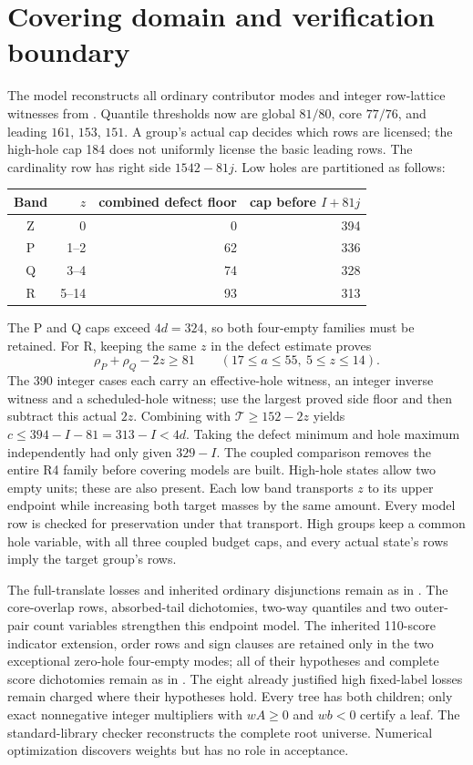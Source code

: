 \documentclass[11pt,a4paper]{article}
\newcommand{\T}{\mathcal T}
\begin{document}
\section{Covering domain and verification boundary}
The model reconstructs all ordinary contributor modes and integer row-lattice
witnesses from \cite{previous}. Quantile thresholds now are global $81/80$,
core $77/76$, and leading $161$, $153$, $151$. A group's actual cap decides
which rows are licensed; the high-hole cap 184 does not uniformly license
the basic leading rows. The cardinality row has right side $1542-81j$.
Low holes are partitioned as follows:
\begin{center}\begin{tabular}{crrr}\toprule
Band&$z$&combined defect floor&cap before $I+81j$\\\midrule
Z&0&0&394\\
P&1--2&62&336\\
Q&3--4&74&328\\
R&5--14&93&313\\\bottomrule
\end{tabular}\end{center}
The P and Q caps exceed $4d=324$, so both four-empty families must
be retained. For R, keeping the same $z$ in the defect estimate proves
\[
 \rho_P+\rho_Q-2z\ge81\qquad(17\le a\le55,\ 5\le z\le14).
\]
The 390 integer cases each carry an effective-hole witness, an integer
inverse witness and a scheduled-hole witness; use the largest proved side
floor and then subtract this actual $2z$. Combining with
$\T\ge152-2z$ yields $c\le394-I-81=313-I<4d$.
Taking the defect minimum and hole maximum independently had only given
$329-I$. The coupled comparison removes the entire R4 family before covering
models are built. High-hole states allow two empty units; these are also
present. Each low band transports $z$ to its upper endpoint while increasing
both target masses by the same amount. Every model row is checked for
preservation under that transport. High groups keep a common hole variable,
with all three coupled budget caps, and every actual state's rows imply
the target group's rows.

The full-translate losses and inherited ordinary disjunctions remain as in
\cite{previous}. The core-overlap rows, absorbed-tail dichotomies, two-way quantiles and
two outer-pair count variables strengthen this endpoint model. The inherited
110-score indicator extension, order rows and sign clauses are retained
only in the two exceptional zero-hole four-empty modes; all of their
hypotheses and complete score dichotomies remain as in \cite{previous}.
The eight already justified high fixed-label losses
remain charged where their hypotheses hold. Every tree has both children;
only exact nonnegative integer multipliers with $wA\ge0$ and $wb<0$ certify
a leaf. The standard-library checker reconstructs the complete root universe.
Numerical optimization discovers weights but has no role in acceptance.
\end{document}
